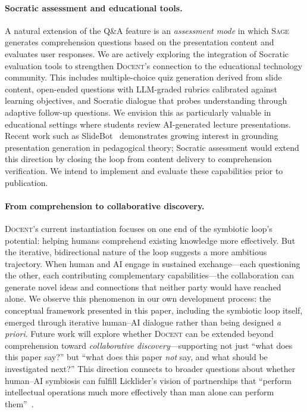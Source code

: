 \documentclass[11pt,a4paper]{article}
\newcommand{\system}{\textsc{Docent}\xspace}
\newcommand{\sage}{\textsc{Sage}\xspace}
\begin{document}
\paragraph{Socratic assessment and educational tools.}
A natural extension of the Q\&A feature is an \emph{assessment mode} in which \sage generates comprehension questions based on the presentation content and evaluates user responses.
We are actively exploring the integration of Socratic evaluation tools to strengthen \system's connection to the educational technology community.
This includes multiple-choice quiz generation derived from slide content, open-ended questions with LLM-graded rubrics calibrated against learning objectives, and Socratic dialogue that probes understanding through adaptive follow-up questions.
We envision this as particularly valuable in educational settings where students review AI-generated lecture presentations.
Recent work such as SlideBot~\citep{xie2026slidebot} demonstrates growing interest in grounding presentation generation in pedagogical theory; Socratic assessment would extend this direction by closing the loop from content delivery to comprehension verification.
We intend to implement and evaluate these capabilities prior to publication.

\paragraph{From comprehension to collaborative discovery.}
\system's current instantiation focuses on one end of the symbiotic loop's potential: helping humans comprehend existing knowledge more effectively.
But the iterative, bidirectional nature of the loop suggests a more ambitious trajectory.
When human and AI engage in sustained exchange---each questioning the other, each contributing complementary capabilities---the collaboration can generate novel ideas and connections that neither party would have reached alone.
We observe this phenomenon in our own development process: the conceptual framework presented in this paper, including the symbiotic loop itself, emerged through iterative human--AI dialogue rather than being designed \emph{a priori}.
Future work will explore whether \system can be extended beyond comprehension toward \emph{collaborative discovery}---supporting not just ``what does this paper say?'' but ``what does this paper \emph{not} say, and what should be investigated next?''
This direction connects to broader questions about whether human--AI symbiosis can fulfill Licklider's vision of partnerships that ``perform intellectual operations much more effectively than man alone can perform them''~\citep{licklider1960symbiosis}.
\end{document}
